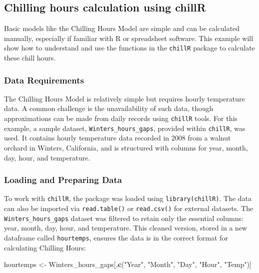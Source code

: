\documentclass[
]{article}
\newenvironment{Shaded}{\begin{snugshade}}{\end{snugshade}}
\newcommand{\FunctionTok}[1]{\textcolor[rgb]{0.13,0.29,0.53}{\textbf{#1}}}
\newcommand{\NormalTok}[1]{#1}
\newcommand{\OtherTok}[1]{\textcolor[rgb]{0.56,0.35,0.01}{#1}}
\newcommand{\StringTok}[1]{\textcolor[rgb]{0.31,0.60,0.02}{#1}}
\begin{document}
\subsection{Chilling hours calculation using chillR}\label{chilling-hours-calculation-using-chillr}

Basic models like the Chilling Hours Model are simple and can be calculated manually, especially if familiar with R or spreadsheet software. This example will show how to understand and use the functions in the \texttt{chillR} package to calculate these chill hours.

\subsubsection{\texorpdfstring{\textbf{Data Requirements}}{Data Requirements}}\label{data-requirements}

The Chilling Hours Model is relatively simple but requires hourly temperature data. A common challenge is the unavailability of such data, though approximations can be made from daily records using \texttt{chillR} tools. For this example, a sample dataset, \texttt{Winters\_hours\_gaps}, provided within \texttt{chillR}, was used. It contains hourly temperature data recorded in 2008 from a walnut orchard in Winters, California, and is structured with columns for year, month, day, hour, and temperature.

\subsubsection{Loading and Preparing Data}\label{loading-and-preparing-data}

To work with \texttt{chillR}, the package was loaded using \texttt{library(chillR)}. The data can also be imported via \texttt{read.table()} or \texttt{read.csv()} for external datasets. The \texttt{Winters\_hours\_gaps} dataset was filtered to retain only the essential columns: year, month, day, hour, and temperature. This cleaned version, stored in a new dataframe called \texttt{hourtemps}, ensures the data is in the correct format for calculating Chilling Hours:

\begin{Shaded}
\begin{Highlighting}[]
\NormalTok{hourtemps }\OtherTok{\textless{}{-}}\NormalTok{ Winters\_hours\_gaps[,}\FunctionTok{c}\NormalTok{(}\StringTok{"Year"}\NormalTok{,}
                                   \StringTok{"Month"}\NormalTok{,}
                                   \StringTok{"Day"}\NormalTok{,}
                                   \StringTok{"Hour"}\NormalTok{,}
                                   \StringTok{"Temp"}\NormalTok{)]}
\end{Highlighting}
\end{Shaded}
\end{document}
